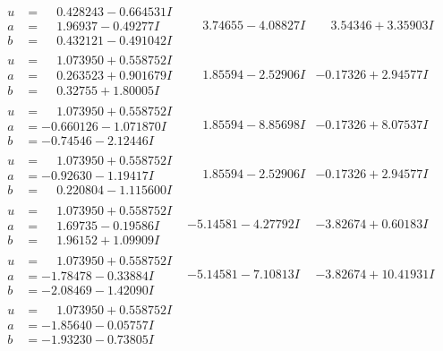 \documentclass[1p]{elsarticle_modified}
\theoremstyle{definition}
\begin{document}
$$\begin{array}{c|c|c}
\begin{aligned}
u &= \phantom{-}0.428243 - 0.664531 I \\
a &= \phantom{-}1.96937 - 0.49277 I \\
b &= \phantom{-}0.432121 - 0.491042 I\end{aligned}
 & \phantom{-}3.74655 - 4.08827 I & \phantom{-}3.54346 + 3.35903 I \\ \hline\begin{aligned}
u &= \phantom{-}1.073950 + 0.558752 I \\
a &= \phantom{-}0.263523 + 0.901679 I \\
b &= \phantom{-}0.32755 + 1.80005 I\end{aligned}
 & \phantom{-}1.85594 - 2.52906 I & -0.17326 + 2.94577 I \\ \hline\begin{aligned}
u &= \phantom{-}1.073950 + 0.558752 I \\
a &= -0.660126 - 1.071870 I \\
b &= -0.74546 - 2.12446 I\end{aligned}
 & \phantom{-}1.85594 - 8.85698 I & -0.17326 + 8.07537 I \\ \hline\begin{aligned}
u &= \phantom{-}1.073950 + 0.558752 I \\
a &= -0.92630 - 1.19417 I \\
b &= \phantom{-}0.220804 - 1.115600 I\end{aligned}
 & \phantom{-}1.85594 - 2.52906 I & -0.17326 + 2.94577 I \\ \hline\begin{aligned}
u &= \phantom{-}1.073950 + 0.558752 I \\
a &= \phantom{-}1.69735 - 0.19586 I \\
b &= \phantom{-}1.96152 + 1.09909 I\end{aligned}
 & -5.14581 - 4.27792 I & -3.82674 + 0.60183 I \\ \hline\begin{aligned}
u &= \phantom{-}1.073950 + 0.558752 I \\
a &= -1.78478 - 0.33884 I \\
b &= -2.08469 - 1.42090 I\end{aligned}
 & -5.14581 - 7.10813 I & -3.82674 + 10.41931 I \\ \hline\begin{aligned}
u &= \phantom{-}1.073950 + 0.558752 I \\
a &= -1.85640 - 0.05757 I \\
b &= -1.93230 - 0.73805 I\end{aligned}

\end{array}$$
\end{document}

